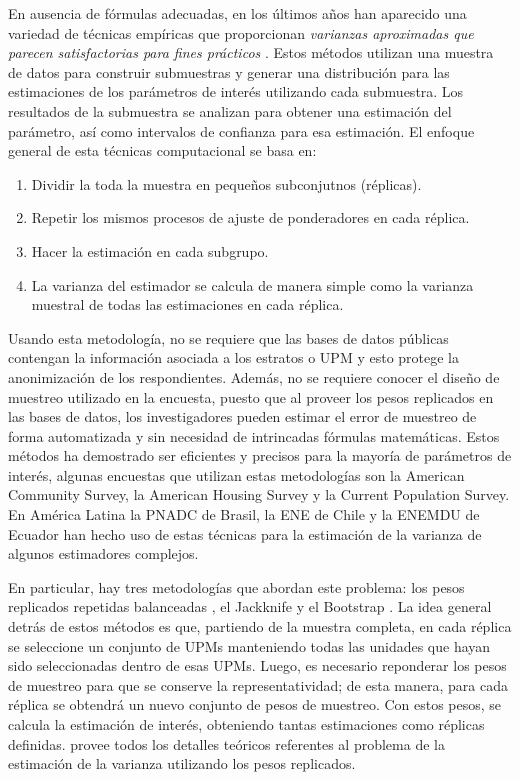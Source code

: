 \documentclass[
  12pt,
  spanish,
]{book}
\providecommand{\tightlist}{%
  \setlength{\itemsep}{0pt}\setlength{\parskip}{0pt}}
\begin{document}
En ausencia de fórmulas adecuadas, en los últimos años han aparecido una variedad de técnicas empíricas que proporcionan \emph{varianzas aproximadas que parecen satisfactorias para fines prácticos} \citep{Kish_1965}. Estos métodos utilizan una muestra de datos para construir submuestras y generar una distribución para las estimaciones de los parámetros de interés utilizando cada submuestra. Los resultados de la submuestra se analizan para obtener una estimación del parámetro, así como intervalos de confianza para esa estimación. El enfoque general de esta técnicas computacional se basa en:

\begin{enumerate}
\def\labelenumi{\arabic{enumi}.}
\tightlist
\item
  Dividir la toda la muestra en pequeños subconjutnos (réplicas).
\item
  Repetir los mismos procesos de ajuste de ponderadores en cada réplica.
\item
  Hacer la estimación en cada subgrupo.
\item
  La varianza del estimador se calcula de manera simple como la varianza muestral de todas las estimaciones en cada réplica.
\end{enumerate}

Usando esta metodología, no se requiere que las bases de datos públicas contengan la información asociada a los estratos o UPM y esto protege la anonimización de los respondientes. Además, no se requiere conocer el diseño de muestreo utilizado en la encuesta, puesto que al proveer los pesos replicados en las bases de datos, los investigadores pueden estimar el error de muestreo de forma automatizada y sin necesidad de intrincadas fórmulas matemáticas. Estos métodos ha demostrado ser eficientes y precisos para la mayoría de parámetros de interés, algunas encuestas que utilizan estas metodologías son la American Community Survey, la American Housing Survey y la Current Population Survey. En América Latina la PNADC de Brasil, la ENE de Chile y la ENEMDU de Ecuador han hecho uso de estas técnicas para la estimación de la varianza de algunos estimadores complejos.

En particular, hay tres metodologías que abordan este problema: los pesos replicados repetidas balanceadas \citep{McCarthy_1969, Judkins_1990}, el Jackknife \citep{Krewski_Rao_1981} y el Bootstrap \citep{Rao_Wu_1988}. La idea general detrás de estos métodos es que, partiendo de la muestra completa, en cada réplica se seleccione un conjunto de UPMs manteniendo todas las unidades que hayan sido seleccionadas dentro de esas UPMs. Luego, es necesario reponderar los pesos de muestreo para que se conserve la representatividad; de esta manera, para cada réplica se obtendrá un nuevo conjunto de pesos de muestreo. Con estos pesos, se calcula la estimación de interés, obteniendo tantas estimaciones como réplicas definidas. \citet{Wolter_2007} provee todos los detalles teóricos referentes al problema de la estimación de la varianza utilizando los pesos replicados.
\end{document}
